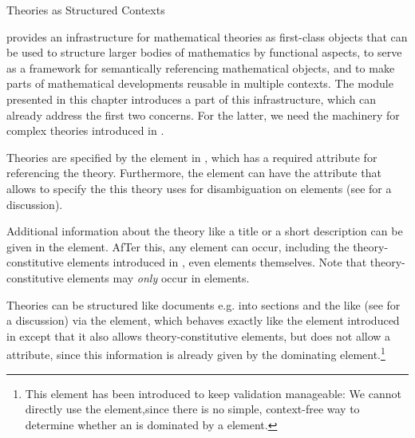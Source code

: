 \begin{omgroup}[short=Mathematical Statements,id=statements]
\begin{omgroup}[id=theories-contexts]{Theories as Structured Contexts}
\begin{module}[id=theories]
\omdoc provides an infrastructure for mathematical theories as first-class objects that
can be used to structure larger bodies of mathematics by functional aspects, to serve as a
framework for semantically referencing mathematical objects, and to make parts of
mathematical developments reusable in multiple contexts. The module {}
presented in this chapter introduces a part of this infrastructure, which can already
address the first two concerns. For the latter, we need the machinery for complex theories
introduced in {}.

\begin{definition}[id=theory.def]
  Theories are specified by the {} element in \omdoc, which has a required
   attribute for referencing the theory. Furthermore,
  the  element can have the 
  attribute that allows to specify the  this theory uses for
  disambiguation on  elements (see {} for a
  discussion).
\end{definition}
Additional information about the theory like a title or a short description can be given
in the  element. AfTer this, any {} \omdoc
element can occur, including the theory-constitutive elements introduced in
{}, even  elements
themselves. Note that theory-constitutive elements may {\emph{only}} occur in
 elements.

\begin{definition}[id=tgroup.def]
  Theories can be structured like documents e.g. into sections and the like (see
  {} for a discussion) via the {} element, which behaves
  exactly like the  element introduced in {} except that
  it also allows theory-constitutive elements, but does not allow a
   attribute, since this information is already given by the
  dominating  element.\footnote{This element has been introduced to keep
    \omdoc validation manageable: We cannot directly use the 
    element,since there is no simple, context-free way to determine whether an
     is dominated by a  element.}
\end{definition}  


\end{module}
\end{omgroup}
\end{omgroup}
